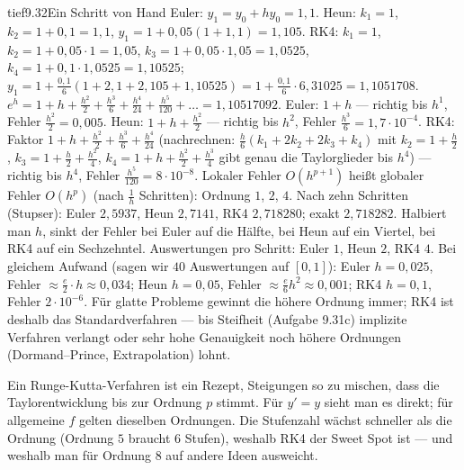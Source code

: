 \begin{loesungkarte}{tief}{9.32}{Ein Schritt von Hand}
Euler: $y_1 = y_0 + hy_0 = 1{,}1$. Heun: $k_1 = 1$, $k_2 = 1 + 0{,}1 = 1{,}1$, $y_1 = 1 + 0{,}05(1 + 1{,}1) = 1{,}105$. RK4: $k_1 = 1$, $k_2 = 1 + 0{,}05\cdot1 = 1{,}05$, $k_3 = 1 + 0{,}05\cdot1{,}05 = 1{,}0525$, $k_4 = 1 + 0{,}1\cdot1{,}0525 = 1{,}10525$; $y_1 = 1 + \frac{0{,}1}6(1 + 2{,}1 + 2{,}105 + 1{,}10525) = 1 + \frac{0{,}1}6\cdot6{,}31025 = 1{,}1051708$.
$e^{h} = 1 + h + \frac{h^{2}}2 + \frac{h^{3}}6 + \frac{h^{4}}{24} + \frac{h^{5}}{120} + \dots = 1{,}10517092$. Euler: $1 + h$ --- richtig bis $h^{1}$, Fehler $\frac{h^{2}}2 = 0{,}005$. Heun: $1 + h + \frac{h^{2}}2$ --- richtig bis $h^{2}$, Fehler $\frac{h^{3}}6 = 1{,}7\cdot10^{-4}$. RK4: Faktor $1 + h + \frac{h^{2}}2 + \frac{h^{3}}6 + \frac{h^{4}}{24}$ (nachrechnen: $\frac h6(k_1 + 2k_2 + 2k_3 + k_4)$ mit $k_2 = 1 + \frac h2$, $k_3 = 1 + \frac h2 + \frac{h^{2}}4$, $k_4 = 1 + h + \frac{h^{2}}2 + \frac{h^{3}}4$ gibt genau die Taylorglieder bis $h^{4}$) --- richtig bis $h^{4}$, Fehler $\frac{h^{5}}{120} = 8\cdot10^{-8}$. Lokaler Fehler $O(h^{p+1})$ heißt globaler Fehler $O(h^{p})$ (nach $\frac1h$ Schritten): Ordnung $1$, $2$, $4$.
Nach zehn Schritten (Stupser): Euler $2{,}5937$, Heun $2{,}7141$, RK4 $2{,}718280$; exakt $2{,}718282$. Halbiert man $h$, sinkt der Fehler bei Euler auf die Hälfte, bei Heun auf ein Viertel, bei RK4 auf ein Sechzehntel.
Auswertungen pro Schritt: Euler $1$, Heun $2$, RK4 $4$. Bei gleichem Aufwand (sagen wir $40$ Auswertungen auf $[0, 1]$): Euler $h = 0{,}025$, Fehler $\approx\frac{e}2\cdot h\approx0{,}034$; Heun $h = 0{,}05$, Fehler $\approx\frac e6h^{2}\approx0{,}001$; RK4 $h = 0{,}1$, Fehler $2\cdot10^{-6}$. Für glatte Probleme gewinnt die höhere Ordnung immer; RK4 ist deshalb das Standardverfahren --- bis Steifheit (Aufgabe 9.31c) implizite Verfahren verlangt oder sehr hohe Genauigkeit noch höhere Ordnungen (Dormand--Prince, Extrapolation) lohnt.
\begin{mitnehmen}\kastentext
Ein Runge-Kutta-Verfahren ist ein Rezept, Steigungen so zu mischen, dass die Taylorentwicklung bis zur Ordnung $p$ stimmt. Für $y' = y$ sieht man es direkt; für allgemeine $f$ gelten dieselben Ordnungen. Die Stufenzahl wächst schneller als die Ordnung (Ordnung $5$ braucht $6$ Stufen), weshalb RK4 der Sweet Spot ist --- und weshalb man für Ordnung $8$ auf andere Ideen ausweicht.
\end{mitnehmen}
\end{loesungkarte}

